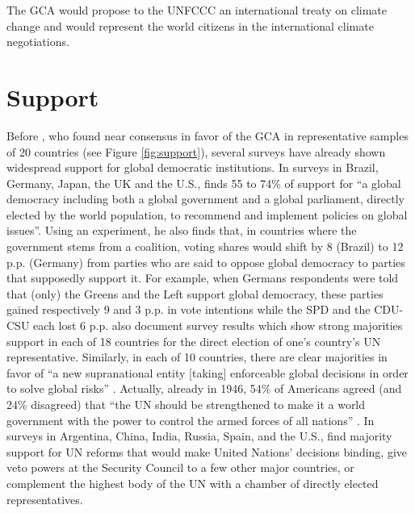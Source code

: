 \documentclass[12pt,english]{article}
\begin{document}
The GCA would propose to the UNFCCC an international treaty on climate change and would represent the world citizens in the international climate negotiations. %

\section{Support}\label{sec:support}

Before \citet{fabre_international_2023}, who found near consensus in favor of the GCA in representative samples of 20 countries (see Figure \ref{fig:support}), several surveys have already shown widespread support for global democratic institutions. In surveys in Brazil, Germany, Japan, the UK and the U.S., \citet{ghassim_who_2020} finds 55 to 74\% of support for ``a global democracy including both a global government and a global parliament, directly elected by the world population, to recommend and implement policies on global issues''. %
Using an experiment, he also finds that, in countries where the government stems from a coalition, voting shares would shift by 8 (Brazil) to 12 p.p. (Germany) from parties who are said to oppose global democracy to parties that supposedly support it. For example, when Germans respondents were told that (only) the Greens and the Left support global democracy, these parties gained respectively 9 and 3 p.p. in vote intentions while the SPD and the CDU-CSU each lost 6 p.p.  
\citet{ghassim_who_2020} also document survey results which show strong majorities support in each of 18 countries for the direct election of one's country's UN representative. %
Similarly, in each of 10 countries, there are clear majorities in favor of ``a new supranational entity [taking] enforceable global decisions in order to solve global risks'' \citep{global_challenges_foundation_attitudes_2018}. Actually, already in 1946, 54\% of Americans agreed (and 24\% disagreed) that ``the UN should be strengthened to make it a world government with the power to control the armed forces of all nations'' \citep{gallup_seventy_1946}. 
In surveys in Argentina, China, India, Russia, Spain, and the U.S., \citet{ghassim_public_2022} find majority support for UN reforms that would make United Nations' decisions binding, give veto powers at the Security Council to a few other major countries, or complement the highest body of the UN with a chamber of directly elected representatives. 
\end{document}
